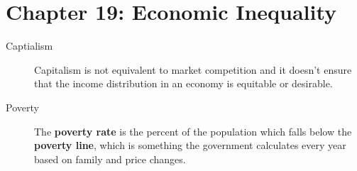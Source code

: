 \documentclass{article}
\begin{document}
\section*{Chapter 19: Economic Inequality}
\begin{description}
    \item[Captialism] Capitalism is not equivalent to market competition and it doesn't ensure that the income distribution in an economy is equitable or desirable.
    \item[Poverty] The \textbf{poverty rate} is the percent of the population which falls below the \textbf{poverty line}, which is something the government calculates every year based on family and price changes. 
\end{description}
\end{document}
